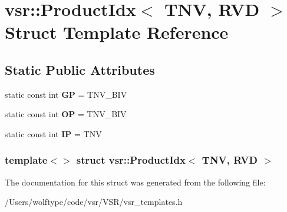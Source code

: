 \hypertarget{structvsr_1_1_product_idx_3_01_t_n_v_00_01_r_v_d_01_4}{\section{vsr\-:\-:Product\-Idx$<$ T\-N\-V, R\-V\-D $>$ Struct Template Reference}
\label{structvsr_1_1_product_idx_3_01_t_n_v_00_01_r_v_d_01_4}
}
\subsection*{Static Public Attributes}
\begin{DoxyCompactItemize}
\item 
\hypertarget{structvsr_1_1_product_idx_3_01_t_n_v_00_01_r_v_d_01_4_aa0e66967b02dba3784da7f326487fc35}{static const int {\bfseries G\-P} = T\-N\-V\-\_\-\-B\-I\-V}\label{structvsr_1_1_product_idx_3_01_t_n_v_00_01_r_v_d_01_4_aa0e66967b02dba3784da7f326487fc35}

\item 
\hypertarget{structvsr_1_1_product_idx_3_01_t_n_v_00_01_r_v_d_01_4_a2d6c9b9e55a6a55b07180fa5fa7c9802}{static const int {\bfseries O\-P} = T\-N\-V\-\_\-\-B\-I\-V}\label{structvsr_1_1_product_idx_3_01_t_n_v_00_01_r_v_d_01_4_a2d6c9b9e55a6a55b07180fa5fa7c9802}

\item 
\hypertarget{structvsr_1_1_product_idx_3_01_t_n_v_00_01_r_v_d_01_4_a1ad5d18dd96d8f47c1048d758d05f1de}{static const int {\bfseries I\-P} = T\-N\-V}\label{structvsr_1_1_product_idx_3_01_t_n_v_00_01_r_v_d_01_4_a1ad5d18dd96d8f47c1048d758d05f1de}

\end{DoxyCompactItemize}
\subsubsection*{template$<$$>$ struct vsr\-::\-Product\-Idx$<$ T\-N\-V, R\-V\-D $>$}



The documentation for this struct was generated from the following file\-:\begin{DoxyCompactItemize}
\item 
/\-Users/wolftype/code/vsr/\-V\-S\-R/vsr\-\_\-templates.\-h\end{DoxyCompactItemize}
